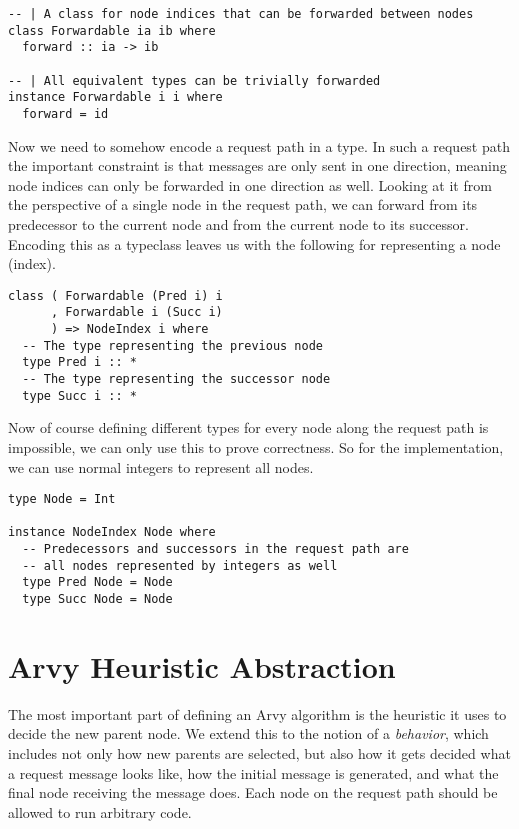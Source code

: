 \documentclass[a4paper, oneside]{discothesis}
\begin{document}
\begin{verbatim}
-- | A class for node indices that can be forwarded between nodes
class Forwardable ia ib where
  forward :: ia -> ib

-- | All equivalent types can be trivially forwarded
instance Forwardable i i where
  forward = id
\end{verbatim}

Now we need to somehow encode a request path in a type. In such a request path the important constraint is that messages are only sent in one direction, meaning node indices can only be forwarded in one direction as well. Looking at it from the perspective of a single node in the request path, we can forward from its predecessor to the current node and from the current node to its successor. Encoding this as a typeclass leaves us with the following for representing a node (index).

\begin{verbatim}
class ( Forwardable (Pred i) i
      , Forwardable i (Succ i)
      ) => NodeIndex i where
  -- The type representing the previous node
  type Pred i :: *
  -- The type representing the successor node
  type Succ i :: *
\end{verbatim}

Now of course defining different types for every node along the request path is impossible, we can only use this to prove correctness. So for the implementation, we can use normal integers to represent all nodes.

\begin{verbatim}
type Node = Int

instance NodeIndex Node where
  -- Predecessors and successors in the request path are
  -- all nodes represented by integers as well
  type Pred Node = Node
  type Succ Node = Node
\end{verbatim}



\section{Arvy Heuristic Abstraction}

The most important part of defining an Arvy algorithm is the heuristic it uses to decide the new parent node. We extend this to the notion of a \textit{behavior}, which includes not only how new parents are selected, but also how it gets decided what a request message looks like, how the initial message is generated, and what the final node receiving the message does. Each node on the request path should be allowed to run arbitrary code.
\end{document}
